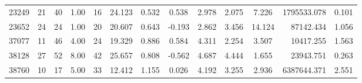 \documentclass[mnsc]{informs3}
\begin{document}
\begin{APPENDICES}
\begin{longtable}{cccccccccccrc}
23249 & 21 & 40 & 1.00 & 16 & 24.123 & 0.532 & 0.538 & 2.978 & 2.075 & 7.226 & 1795533.078 & 0.101 \\
23652 & 24 & 24 & 1.00 & 20 & 20.607 & 0.643 & -0.193 & 2.862 & 3.456 & 14.124 & 87142.434 & 1.056 \\
37077 & 11 & 46 & 4.00 & 24 & 19.329 & 0.886 & 0.584 & 4.311 & 2.254 & 3.507 & 10417.255 & 1.563 \\
38128 & 27 & 52 & 8.00 & 42 & 25.657 & 0.808 & -0.562 & 4.687 & 4.444 & 1.655 & 23943.751 & 0.263 \\
38760 & 10 & 17 & 5.00 & 33 & 12.412 & 1.155 & 0.026 & 4.192 & 3.255 & 2.936 & 6387644.371 & 2.551 \\
\bottomrule
\end{longtable}

\end{APPENDICES}










%



\end{document}
